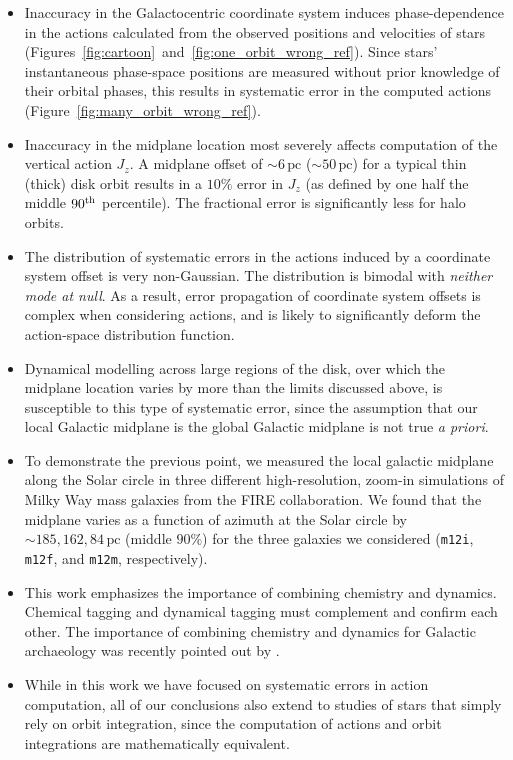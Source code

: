 \documentclass[twocolumn]{aastex62}
\newcommand{\pc}{\text{pc}}
\newcommand{\mi}{\texttt{m12i}}
\newcommand{\mf}{\texttt{m12f}}
\newcommand{\mm}{\texttt{m12m}}
\newcommand{\uth}{\textsuperscript{th}}
\begin{document}
\begin{itemize}
\item Inaccuracy in the Galactocentric coordinate
system induces phase-dependence in the actions calculated from the observed
positions and velocities of stars
(Figures~\ref{fig:cartoon}~and~\ref{fig:one_orbit_wrong_ref}). Since stars'
instantaneous phase-space positions are measured without prior knowledge of
their orbital phases, this results in systematic error in the computed actions
(Figure~\ref{fig:many_orbit_wrong_ref}).

\item Inaccuracy in the midplane location most severely affects computation of
the vertical action $J_z$.  A midplane offset of $\sim6\,\pc$ ($\sim50\,\pc$)
for a typical thin (thick) disk orbit results in a  $10\%$ error in $J_z$ (as
defined by one half the middle $90\uth$ percentile). The fractional error is
significantly less for halo orbits.

\item The distribution of systematic errors in the actions induced by a
coordinate system offset is very non-Gaussian. The distribution is bimodal
with {\em neither mode at null}. As a result, error propagation of coordinate
system offsets is complex when considering actions, and is likely to
significantly deform the action-space distribution function.

\item Dynamical modelling across large regions of the disk, over which the
midplane location varies by more than the limits discussed above, is
susceptible to this type of systematic error, since the assumption that our
local Galactic midplane is the global Galactic midplane is not true {\em a
priori}.

\item To demonstrate the previous point, we measured the local galactic
midplane along the Solar circle in three different high-resolution, zoom-in
simulations of Milky Way mass galaxies from the FIRE collaboration. We found
that the midplane varies as a function of azimuth at the Solar circle by
$\sim185, 162, 84\,\pc$ (middle $90\%$) for the three galaxies we considered
(\mi{}, \mf{}, and \mm{}, respectively).

\item This work emphasizes the importance of combining chemistry and dynamics.
Chemical tagging \citep{2002ARA&A..40..487F} and dynamical tagging must
complement and confirm each other. The importance of combining chemistry and
dynamics for Galactic archaeology was recently pointed out by
\citet{2019arXiv190210719K}.

\item While in this work we have focused on systematic errors in action
computation, all of our conclusions also extend to studies of stars that
simply rely on orbit integration, since the computation of actions and orbit
integrations are mathematically equivalent.

\end{itemize}
\end{document}
